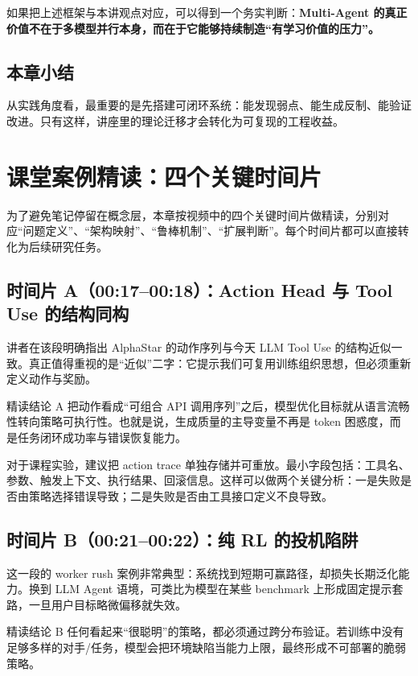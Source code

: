 \documentclass[a4paper]{article}
\begin{document}
如果把上述框架与本讲观点对应，可以得到一个务实判断：\textbf{Multi-Agent 的真正价值不在于多模型并行本身，而在于它能够持续制造``有学习价值的压力''。}

\subsection{本章小结}
从实践角度看，最重要的是先搭建可闭环系统：能发现弱点、能生成反制、能验证改进。只有这样，讲座里的理论迁移才会转化为可复现的工程收益。

\section{课堂案例精读：四个关键时间片}

为了避免笔记停留在概念层，本章按视频中的四个关键时间片做精读，分别对应``问题定义''、``架构映射''、``鲁棒机制''、``扩展判断''。每个时间片都可以直接转化为后续研究任务。

\subsection{时间片 A（00:17--00:18）：Action Head 与 Tool Use 的结构同构}
讲者在该段明确指出 AlphaStar 的动作序列与今天 LLM Tool Use 的结构近似一致。真正值得重视的是``近似''二字：它提示我们可复用训练组织思想，但必须重新定义动作与奖励。

\begin{importantbox}{精读结论 A}
把动作看成``可组合 API 调用序列''之后，模型优化目标就从语言流畅性转向策略可执行性。也就是说，生成质量的主导变量不再是 token 困惑度，而是任务闭环成功率与错误恢复能力。
\end{importantbox}

对于课程实验，建议把 action trace 单独存储并可重放。最小字段包括：工具名、参数、触发上下文、执行结果、回滚信息。这样可以做两个关键分析：一是失败是否由策略选择错误导致；二是失败是否由工具接口定义不良导致。

\subsection{时间片 B（00:21--00:22）：纯 RL 的投机陷阱}
这一段的 worker rush 案例非常典型：系统找到短期可赢路径，却损失长期泛化能力。换到 LLM Agent 语境，可类比为模型在某些 benchmark 上形成固定提示套路，一旦用户目标略微偏移就失效。

\begin{warningbox}{精读结论 B}
任何看起来``很聪明''的策略，都必须通过跨分布验证。若训练中没有足够多样的对手/任务，模型会把环境缺陷当能力上限，最终形成不可部署的脆弱策略。
\end{warningbox}
\end{document}
